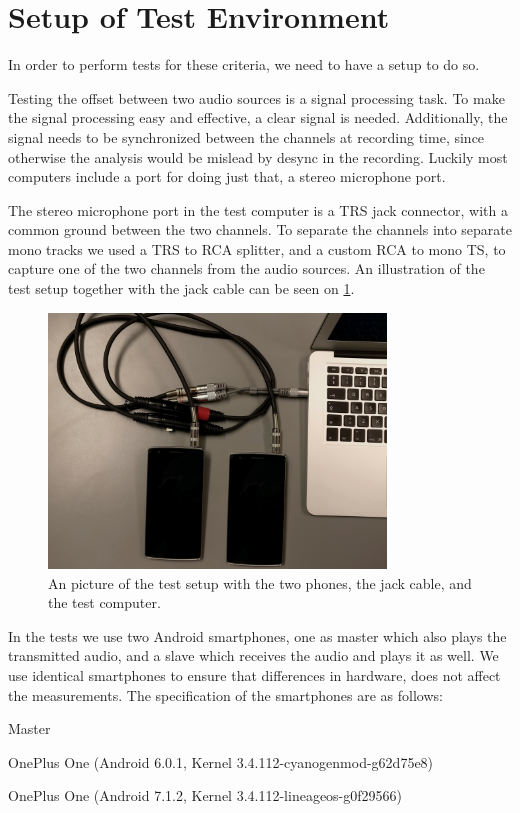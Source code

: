\section{Setup of Test Environment}\label{sec:test_setup}
In order to perform tests for these criteria, we need to have a setup to do so.

Testing the offset between two audio sources is a signal processing
task. To make the signal processing easy and effective, a clear signal is
needed. Additionally, the signal needs to be synchronized between the
channels at recording time, since otherwise the analysis would be
mislead by desync in the recording. Luckily most computers include
a port for doing just that, a stereo microphone port.

The stereo microphone port in the test computer is a \ac{TRS} jack
connector, with a common ground between the two channels. To separate
the channels into separate mono tracks we used a \ac{TRS} to \ac{RCA}
splitter, and a custom \ac{RCA} to mono \ac{TS}, to capture one of the two
channels from the audio sources.
An illustration of the test setup together with the jack cable can be seen on \cref{fig:test_setup}.

\begin{figure}[!bht]
    \centering
    \includegraphics[width=0.8\textwidth]{img/test_setup.jpg}
    \caption{An picture of the test setup with the two phones, the jack cable, and the test computer.}\label{fig:test_setup}
\end{figure}

In the tests we use two Android smartphones, one as master which also plays the transmitted audio, and a slave which receives the audio and plays it as well.
We use identical smartphones to ensure that differences in hardware, does not affect the measurements.
The specification of the smartphones are as follows:
\begin{dankscription}{\bfseries}{Master}
    \item[Master]OnePlus One (Android 6.0.1, Kernel 3.4.112-cyanogenmod-g62d75e8)
    \item[Slave]OnePlus One (Android 7.1.2, Kernel 3.4.112-lineageos-g0f29566)
\end{dankscription}

